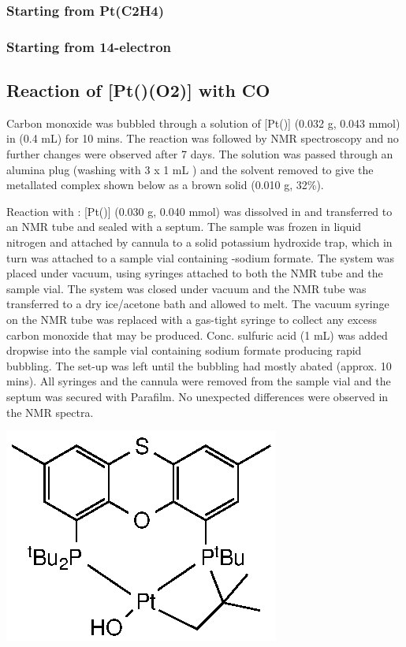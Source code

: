 \subsubsection{Starting from Pt(C2H4)}
\subsubsection{Starting from 14-electron}

\subsection*{Reaction of [Pt(\tButhixantphos)(O2)] with CO}

Carbon monoxide was bubbled through a solution of [Pt(\tButhixantphos)] (0.032 g, 0.043 mmol) in  (0.4 mL) for 10 mins.  The reaction was followed by NMR spectroscopy and no further changes were observed after 7 days.  The solution was passed through an alumina plug (washing with 3 x 1 mL ) and the solvent removed  to give the metallated complex shown below as a brown solid (0.010 g, 32\%).  

Reaction with :
[Pt(\tButhixantphos)] (0.030 g, 0.040 mmol) was dissolved in  and transferred to an NMR tube and sealed with a septum.  The sample was frozen in liquid nitrogen and attached by cannula to a solid potassium hydroxide trap, which in turn was attached to a sample vial containing \carbon{}-sodium formate.  The system was placed under vacuum, using syringes attached to both the NMR tube and the sample vial.  The system was closed under vacuum and the NMR tube was transferred to a dry ice/acetone bath and allowed to melt.  The vacuum syringe on the NMR tube was replaced with a gas-tight syringe to collect any excess carbon monoxide that may be produced.  Conc. sulfuric acid (1 mL) was added dropwise into the sample vial containing sodium formate producing rapid bubbling.  The set-up was left until the bubbling had mostly abated (approx. 10 mins).  All syringes and the cannula were removed from the sample vial and the septum was secured with Parafilm.  No unexpected differences were observed in the NMR spectra.  

\begin{structure}[h]
\begin{center}
\includegraphics{../Structures/Metallated.eps}
\end{center}
\end{structure}

